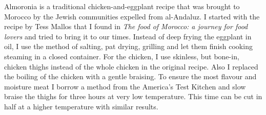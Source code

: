 \documentclass[11pt,letterpaper]{article}
\begin{document}


Almoronia is a traditional chicken-and-eggplant recipe that was brought to Morocco by the Jewish communities expelled from al-Andaluz. I started with the recipe by Tess Mallos that I found in {\it The food of Morocco: a journey for food lovers} and tried to bring it to our times. Instead of deep frying the eggplant in oil, I use the method of salting, pat drying, grilling and let them finish cooking steaming in a closed container. For the chicken, I use skinless, but bone-in, chicken thighs instead of the whole chicken in the original recipe. Also I replaced the boiling of the chicken with a gentle braising. To ensure the most flavour and moisture meat I borrow a method from the America's Test Kitchen and slow braise the thighs for three hours at very low temperature. This time can be cut in half at a higher temperature with similar results.
\end{document}
